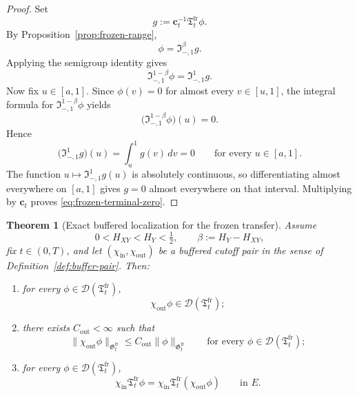 \documentclass[11pt,a4paper]{amsart}
\theoremstyle{plain}
\newtheorem{theorem}{Theorem}[section]
\theoremstyle{definition}
\theoremstyle{remark}
\begin{document}
\begin{proof}
Set
\[
g:=\mathbf c_t^{-1}\mathfrak T_t^{\mathrm{fr}}\phi.
\]
By Proposition~\ref{prop:frozen-range},
\[
\phi=\mathfrak I_{-,1}^{\beta}g.
\]
Applying the semigroup identity gives
\[
\mathfrak I_{-,1}^{1-\beta}\phi
=
\mathfrak I_{-,1}^{1}g.
\]
Now fix \(u\in[a,1]\). Since \(\phi(v)=0\) for almost every \(v\in[u,1]\), the integral formula for
\(\mathfrak I_{-,1}^{1-\beta}\phi\) yields
\[
\bigl(\mathfrak I_{-,1}^{1-\beta}\phi\bigr)(u)=0.
\]
Hence
\[
\bigl(\mathfrak I_{-,1}^{1}g\bigr)(u)=\int_u^1 g(v)\,dv=0
\qquad\text{for every }u\in[a,1].
\]
The function \(u\mapsto \mathfrak I_{-,1}^{1}g(u)\) is absolutely continuous, so differentiating
almost everywhere on \([a,1]\) gives \(g=0\) almost everywhere on that interval. Multiplying by
\(\mathbf c_t\) proves \eqref{eq:frozen-terminal-zero}.
\end{proof}

\begin{theorem}[Exact buffered localization for the frozen transfer]
\label{thm:frozen-buffered}
Assume
\[
0<H_{XY}<H_Y<\tfrac12,
\qquad
\beta:=H_Y-H_{XY},
\]
fix \(t\in(0,T)\), and let \((\chi_{\mathrm{in}},\chi_{\mathrm{out}})\) be a buffered cutoff pair in
the sense of Definition~\ref{def:buffer-pair}. Then:
\begin{enumerate}[label=(\roman*)]
\item for every \(\phi\in\mathcal D(\mathfrak T_t^{\mathrm{fr}})\),
\[
\chi_{\mathrm{out}}\phi\in\mathcal D(\mathfrak T_t^{\mathrm{fr}});
\]
\item there exists \(C_{\mathrm{out}}<\infty\) such that
\begin{equation}\label{eq:frozen-buffered-stability}
\|\chi_{\mathrm{out}}\phi\|_{\mathfrak G_t^{\mathrm{fr}}}
\le
C_{\mathrm{out}}\|\phi\|_{\mathfrak G_t^{\mathrm{fr}}}
\qquad\text{for every }\phi\in\mathcal D(\mathfrak T_t^{\mathrm{fr}});
\end{equation}
\item for every \(\phi\in\mathcal D(\mathfrak T_t^{\mathrm{fr}})\),
\begin{equation}\label{eq:frozen-buffered-exact}
\chi_{\mathrm{in}}\mathfrak T_t^{\mathrm{fr}}\phi
=
\chi_{\mathrm{in}}\mathfrak T_t^{\mathrm{fr}}(\chi_{\mathrm{out}}\phi)
\qquad\text{in }E.
\end{equation}
\end{enumerate}
\end{theorem}
\end{document}
